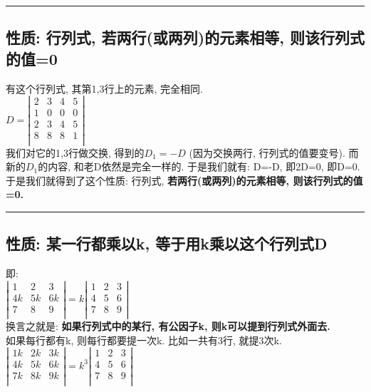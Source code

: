\documentclass[UTF8]{ctexart}
\begin{document}
	\hrule
	
	\subsection{性质: 行列式, 若两行(或两列)的元素相等, 则该行列式的值=0}
	
	有这个行列式, 其第1,3行上的元素, 完全相同. \\
	$
	D=\left| \begin{matrix}
		2&		3&		4&		5\\
		1&		0&		0&		0\\
		2&		3&		4&		5\\
		8&		8&		8&		1\\
	\end{matrix} \right|
	$ \\
	
	我们对它的1,3行做交换, 得到的$D_1 = -D$ (因为交换两行, 行列式的值要变号). 而新的$D_1$的内容, 和老D依然是完全一样的. 于是我们就有: D=-D, 即2D=0, 即D=0. \\	
	于是我们就得到了这个性质: 行列式, \textbf{若两行(或两列)的元素相等, 则该行列式的值=0.}\\
	
	\hrule
	
	\subsection{性质: 某一行都乘以k, 等于用k乘以这个行列式D }
	即:\\
	$
	\left| \begin{matrix}
		1&		2&		3\\
		4k&		5k&		6k\\
		7&		8&		9\\
	\end{matrix} \right|=k\left| \begin{matrix}
		1&		2&		3\\
		4&		5&		6\\
		7&		8&		9\\
	\end{matrix} \right|
	$\\
	
	换言之就是: \textbf{如果行列式中的某行, 有公因子k, 则k可以提到行列式外面去.} \\
	
	如果每行都有k, 则每行都要提一次k. 比如一共有3行, 就提3次k. \\
	$
	\left| \begin{matrix}
		1k&		2k&		3k\\
		4k&		5k&		6k\\
		7k&		8k&		9k\\
	\end{matrix} \right|=k^3\left| \begin{matrix}
		1&		2&		3\\
		4&		5&		6\\
		7&		8&		9\\
	\end{matrix} \right|
	$ \\
	
\end{document}
